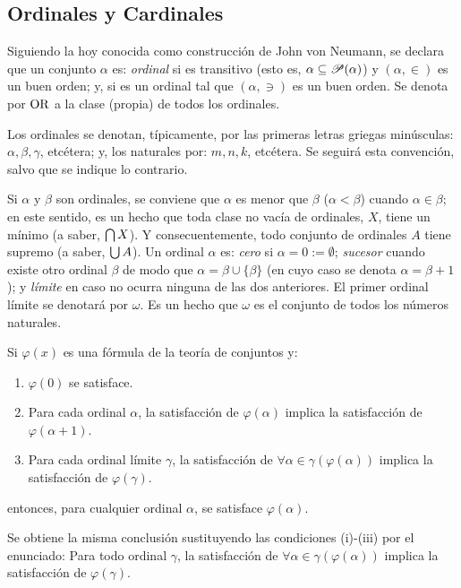 \subsection{Ordinales y Cardinales}

\index[sym]{$\OR$}
Siguiendo la hoy conocida como construcción de John von Neumann, se declara que un conjunto $\alpha$ es: \textit{ordinal} si es transitivo (esto es, $\alpha \subseteq \mathscr{P}(\alpha)$) y $(\alpha,\in)$ es un buen orden; y,  si es un ordinal tal que $(\alpha,\ni)$ es un buen orden. Se denota por $\OR$ a la clase (propia) de todos los ordinales.

Los ordinales se denotan, típicamente, por las primeras letras griegas minúsculas: $\alpha, \beta, \gamma$, etcétera; y, los naturales por: $m,n,k$, etcétera. Se seguirá esta convención, salvo que se indique lo contrario.

\index[sym]{$\omega$}\index[sym]{$\alpha < \beta$}
Si $\alpha$ y $\beta$ son ordinales, se conviene que $\alpha$ es menor que $\beta$ ($\alpha<\beta$) cuando $\alpha \in \beta$; en este sentido, es un hecho que toda clase no vacía de ordinales, $X$, tiene un mínimo (a saber, $\mbox{$\bigcap$}\, X$). Y consecuentemente, todo conjunto de ordinales $A$ tiene supremo (a saber, $\mbox{$\bigcup$}\, A$). Un ordinal $\alpha$ es: \textit{cero} si $\alpha=0:=\emptyset$; \textit{sucesor} cuando existe otro ordinal $\beta$ de modo que $\alpha = \beta \cup \{\beta\}$ (en cuyo caso se denota $\alpha=\beta+1$); y \textit{límite} en caso no ocurra ninguna de las dos anteriores. El primer ordinal límite se denotará por $\omega$. Es un hecho que $\omega$ es el conjunto de todos los números naturales.

\begin{teorema}
	Si $\varphi(x)$ es una fórmula de la teoría de conjuntos y:
	\begin{enumerate}
		\item $\varphi(0)$ se satisface.
		\item Para cada ordinal $\alpha$, la satisfacción de $\varphi(\alpha)$ implica la satisfacción de $\varphi(\alpha+1)$.
		\item Para cada ordinal límite $\gamma$, la satisfacción de $\forall \alpha \in \gamma (\varphi(\alpha))$ implica la satisfacción de $\varphi(\gamma)$.
	\end{enumerate}
	entonces, para cualquier ordinal $\alpha$, se satisface $\varphi(\alpha)$.

	Se obtiene la misma conclusión sustituyendo las condiciones (i)-(iii) por el enunciado: Para todo ordinal $\gamma$, la satisfacción de $\forall \alpha \in \gamma (\varphi(\alpha))$ implica la satisfacción de $\varphi(\gamma)$.
\end{teorema}

